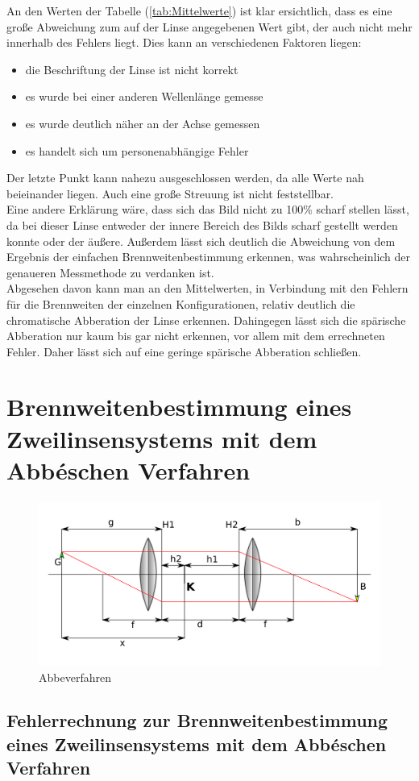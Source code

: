 An den Werten der Tabelle (\ref{tab:Mittelwerte}) ist klar ersichtlich, dass es eine große Abweichung zum auf der Linse angegebenen Wert gibt, der auch nicht mehr innerhalb des Fehlers liegt. Dies kann an verschiedenen Faktoren liegen: \\

\begin{itemize}
\item die Beschriftung der Linse ist nicht korrekt
\item es wurde bei einer anderen Wellenlänge gemesse
\item es wurde deutlich näher an der Achse gemessen
\item es handelt sich um personenabhängige Fehler
\end{itemize}

Der letzte Punkt kann nahezu ausgeschlossen werden, da alle Werte nah beieinander liegen.
Auch eine große Streuung ist nicht feststellbar.\\
Eine andere Erklärung wäre, dass sich das Bild nicht zu 100\% scharf stellen lässt, da bei dieser Linse entweder der innere Bereich des Bilds scharf gestellt werden konnte oder der äußere. Außerdem lässt sich deutlich die Abweichung von dem Ergebnis der einfachen Brennweitenbestimmung erkennen, was wahrscheinlich der genaueren Messmethode zu verdanken ist.\\
Abgesehen davon kann man an den Mittelwerten, in Verbindung mit den Fehlern für die Brennweiten der einzelnen Konfigurationen, relativ deutlich die chromatische Abberation der Linse erkennen. Dahingegen lässt sich die spärische Abberation nur kaum bis gar nicht erkennen, vor allem mit dem errechneten Fehler. Daher lässt sich auf eine geringe spärische Abberation schließen.


\section{Brennweitenbestimmung eines Zweilinsensystems mit dem Abbéschen Verfahren}

\begin{figure}[h!]
    \centering
    \includegraphics[scale=0.8]{Geometrische_Optik/Protokoll/fig/Abbeverfahren.png}
    \caption{Abbeverfahren}
    \label{fig:Abbeverfahren}
\end{figure}

\subsection{Fehlerrechnung zur Brennweitenbestimmung eines Zweilinsensystems mit dem Abbéschen Verfahren}